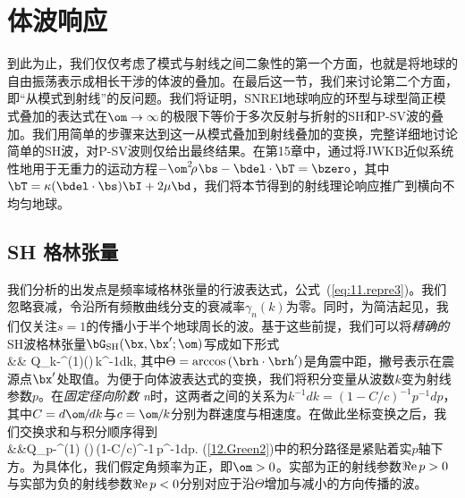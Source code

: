 \section{体波响应}
%
%
\label{12.sec.Green}

到此为止，我们仅仅考虑了模式与射线之间二象性的第一个方面，也就是将地球的自由振荡表示成相长干涉的体波的叠加。在最后这一节，我们来讨论第二个方面，即“从模式到射线”的反问题。我们将证明，SNREI地球响应的环型与球型简正模式叠加的表达式在$\om\rightarrow\infty$的极限下等价于多次反射与折射的SH和P-SV波的叠加。我们用简单的步骤来达到这一从模式叠加到射线叠加的变换，完整详细地讨论简单的SH波，对P-SV波则仅给出最终结果。在第15章中，通过将JWKB近似系统性地用于无重力的运动方程$-\om^2\!\rho\hspace{0.3 mm}\bs-\bdel\cdot\bT=\bzero$，其中$\bT=\kappa(\bdel\cdot\bs)\bI+2\mu\bd$，我们将本节得到的射线理论响应推广到横向不均匀地球。

\subsection{SH 格林张量}
%
%

我们分析的出发点是频率域格林张量的行波表达式，公式~(\ref{eq:11.repre3})。我们忽略衰减，令沿所有频散曲线分支的衰减率$\gamma_n(k)$为零。同时，为简洁起见，我们仅关注$s=1$的传播小于半个地球周长的波。基于这些前提，我们可以将{\em 精确的\/}SH波格林张量$\bG_{\rm SH}(\bx,\bx';\om)$写成如下形式
\eqa \label{12.Green}  \nonumber \\
&&\mbox{}\qquad\qquad\qquad\times
Q_{k-\subhalf}^{(1)}(\cos\Theta)\,k^{-1}dk,
\ena
其中$\Theta={\rm arccos}\,(\brh\cdot\brh')$是角震中距，撇号表示在震源点$\bx'$处取值。为便于向体波表达式的变换，我们将积分变量从波数$k$变为射线参数$p$。在{\em 固定径向阶数 n\/}时，这两者之间的关系为$k^{-1}dk=(1-C/c)^{-1}p^{-1}dp$，其中$C=d\om\hspace{-0.3 mm}/\hspace{-0.3 mm}dk$与$c=\om\hspace{-0.2 mm}/\hspace{-0.2 mm}k$分别为群速度与相速度。在做此坐标变换之后，我们交换求和与积分顺序得到
\eqa \label{12.Green2}  \nonumber \\
&&\mbox{}\qquad\qquad\qquad\times Q_{\omega p-\subhalf}^{(1)}
(\cos\Theta)\,(1-C/c)^{-1}\,p^{-1}dp.
\ena
(\ref{12.Green2})中的积分路径是紧贴着实$p$轴下方。为具体化，我们假定角频率为正，即$\om>0$。实部为正的射线参数$\Re{\rm e}\,p>0$与实部为负的射线参数$\Re{\rm e}\,p<0$分别对应于沿$\Theta$增加与减小的方向传播的波。

